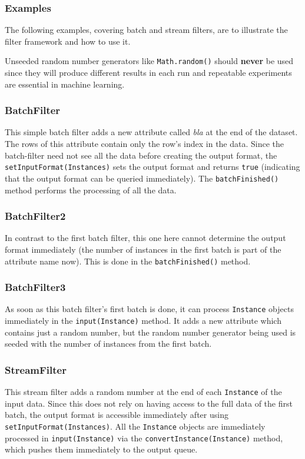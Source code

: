 \newpage
\subsubsection{Examples}
The following examples, covering batch and stream filters, are to illustrate the
filter framework and how to use it.

Unseeded random number generators like \texttt{Math.random()} should
\textbf{never} be used since they will produce different results in each run and
repeatable experiments are essential in machine learning.

\subsubsection*{BatchFilter}
This simple batch filter adds a new attribute called \textit{bla} at the end of
the dataset. The rows of this attribute contain only the row's index in the
data. Since the batch-filter need not see all the data before creating the
output format, the \texttt{setInputFormat(Instances)} sets the output format and
returns \texttt{true} (indicating that the output format can be queried
immediately). The \texttt{batchFinished()} method performs the processing of all
the data.

{\scriptsize }

\newpage
\subsubsection*{BatchFilter2}
In contrast to the first batch filter, this one here cannot determine the output
format immediately (the number of instances in the first batch is part of the
attribute name now). This is done in the \texttt{batchFinished()} method.

{\scriptsize }

\newpage
\subsubsection*{BatchFilter3}
As soon as this batch filter's first batch is done, it can process
\texttt{Instance} objects immediately in the \texttt{input(Instance)} method. It
adds a new attribute which contains just a random number, but the random number
generator being used is seeded with the number of instances from the first
batch.

{\scriptsize }

\newpage
\subsubsection*{StreamFilter}
This stream filter adds a random number at the end of each \texttt{Instance} of
the input data. Since this does not rely on having access to the full data of
the first batch, the output format is accessible immediately after using
\texttt{setInputFormat(Instances)}. All the \texttt{Instance} objects are
immediately processed in \texttt{input(Instance)} via the
\texttt{convertInstance(Instance)} method, which pushes them immediately to the
output queue.

